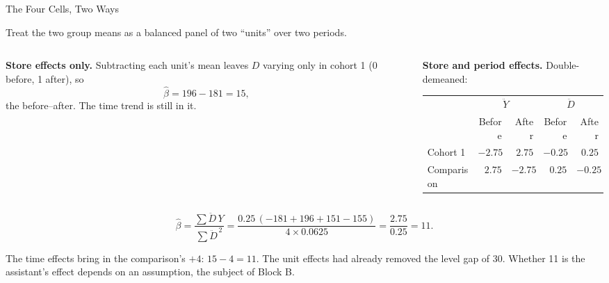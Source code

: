 \documentclass[aspectratio=169, 11pt, handout]{beamer}
\begin{document}
\begin{frame}{The Four Cells, Two Ways}

Treat the two group means as a balanced panel of two ``units'' over two periods.

\begin{columns}[T]
\begin{column}{0.40\textwidth}
\textbf{Store effects only.} Subtracting each unit's mean leaves $D$ varying only in cohort 1 (0 before, 1 after), so
\[
\hat\beta = 196 - 181 = 15,
\]
the before--after. The time trend is still in it.
\end{column}
\begin{column}{0.56\textwidth}
\textbf{Store and period effects.} Double-demeaned:
\begin{center}
\small
\begin{tabular}{lrr|rr}
\toprule
& \multicolumn{2}{c|}{$\ddot Y$} & \multicolumn{2}{c}{$\ddot D$} \\
& Before & After & Before & After \\
\midrule
Cohort 1 & $-2.75$ & $2.75$ & $-0.25$ & $0.25$ \\
Comparison & $2.75$ & $-2.75$ & $0.25$ & $-0.25$ \\
\bottomrule
\end{tabular}
\end{center}
\end{column}
\end{columns}

\[
\hat\beta = \frac{\sum \ddot D\,Y}{\sum \ddot D^{\,2}} = \frac{0.25\,(-181 + 196 + 151 - 155)}{4 \times 0.0625} = \frac{2.75}{0.25} = 11.
\]

The time effects bring in the comparison's $+4$: $15 - 4 = 11$. The unit effects had already removed the level gap of 30. Whether 11 is the assistant's effect depends on an assumption, the subject of Block B.
\end{frame}
\end{document}
